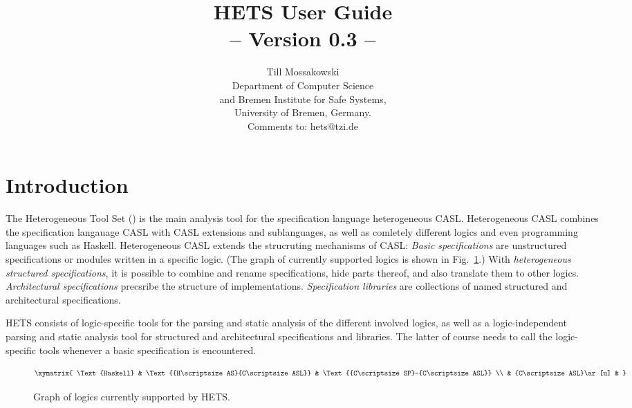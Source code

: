 \documentclass{article}
\newcommand{\normalTEXTSC}[2]{{#1\scriptsize#2}}
\newcommand     {\CASL}{\normalTEXTSC{C}{ASL}\xspace}
\newcommand     {\Hets}{\normalTEXTSC{H}{ETS}\xspace}
\newcommand     {\HasCASL}{\normalTEXTSC{H}{AS}\normalTEXTSC{C}{ASL}\xspace}
\newcommand{\CspCASL}{\normalTEXTSC{C}{SP}-\normalTEXTSC{C}{ASL}\xspace}
\begin{document}
\title{{\bf \Hets User Guide}\\ 
-- Version 0.3 --}
\author{Till Mossakowski\\[1em]
Department of Computer Science\\ and Bremen
Institute for Safe Systems,\\ University of Bremen, Germany.\\[1em]
Comments to: hets@tzi.de
}

\maketitle

\section{Introduction}


The Heterogeneous Tool Set (\protect\Hets) is the main analysis tool
for the specification language heterogeneous \CASL. Heterogeneous
\CASL combines the specification langauage \CASL with \CASL extensions
and sublanguages, as well as comletely different logics and even
programming languages such as Haskell. Heterogeneous \CASL
extends the strucruting mechanisms of \CASL:
\emph{Basic specifications} are
unstructured specifications or modules written in a specific logic.
(The graph of currently supported logics is shown in Fig.~\ref{fig:LogicGraph}.)
With \emph{heterogeneous structured specifications}, it is possible to
combine and rename specifications, hide parts thereof, and also
translate them to other logics. \emph{Architectural specifications}
precsribe the structure of implementations.
\emph{Specification libraries} are collections of named structured
and architectural specifications.

\Hets consists of logic-specific tools for the parsing and static
analysis of the different involved logics, as well as a
logic-independent parsing and static analysis tool for structured and
architectural specifications and libraries. The latter of course needs
to call the logic-specific tools whenever a basic specification is
encountered.

\begin{figure}
$$\xymatrix{
\Text{Haskell} 
&
\Text{\HasCASL}
&
\Text{\CspCASL} \\
&
\CASL \ar[u]
&
}$$
\caption{Graph of logics currently supported by \Hets.\label{fig:LogicGraph}}
\end{figure}
\end{document}
